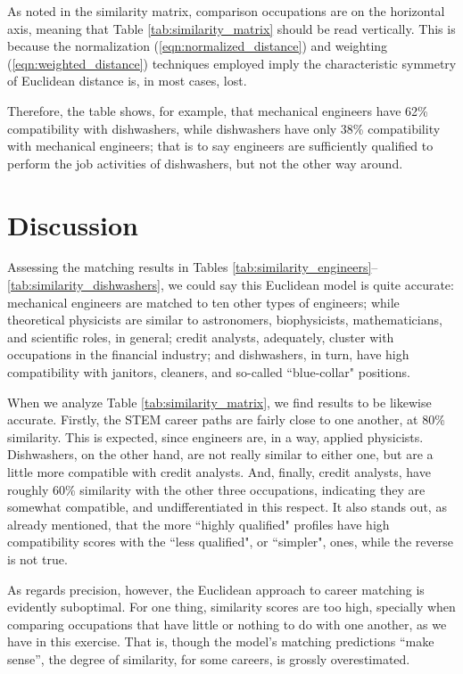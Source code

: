 \documentclass{article}
\begin{document}
As noted in the similarity matrix, comparison occupations are on the horizontal
axis, meaning that Table \ref{tab:similarity_matrix} should be read vertically.
This is because the normalization (\ref{eqn:normalized_distance}) and weighting
(\ref{eqn:weighted_distance}) techniques employed imply the characteristic
symmetry of Euclidean distance is, in most cases, lost.

Therefore, the table shows, for example, that mechanical engineers have 62\%
compatibility with dishwashers, while dishwashers have only 38\% compatibility
with mechanical engineers; that is to say engineers are sufficiently qualified
to perform the job activities of dishwashers, but not the other way around.

\section{Discussion}
Assessing the matching results in Tables
\ref{tab:similarity_engineers}--\ref{tab:similarity_dishwashers}, we could say
this Euclidean model is quite accurate: mechanical engineers are matched to ten
other types of engineers; while theoretical physicists are similar to
astronomers, biophysicists, mathematicians, and scientific roles, in general;
credit analysts, adequately, cluster with occupations in the financial
industry; and dishwashers, in turn, have high compatibility with janitors,
cleaners, and so-called ``blue-collar" positions.

When we analyze Table \ref{tab:similarity_matrix}, we find results to be
likewise accurate. Firstly, the STEM career paths are fairly close to one
another, at 80\% similarity. This is expected, since engineers are, in a way,
applied physicists. Dishwashers, on the other hand, are not really similar to
either one, but are a little more compatible with credit analysts. And,
finally, credit analysts, have roughly 60\% similarity with the other three
occupations, indicating they are somewhat compatible, and undifferentiated in
this respect. It also stands out, as already mentioned, that the more ``highly
qualified" profiles have high compatibility scores with the ``less qualified",
or ``simpler", ones, while the reverse is not true.

As regards precision, however, the Euclidean approach to career matching is
evidently suboptimal. For one thing, similarity scores are too high, specially
when comparing occupations that have little or nothing to do with one another,
as we have in this exercise. That is, though the model's matching predictions
``make sense'', the degree of similarity, for some careers, is grossly
overestimated.
\end{document}
